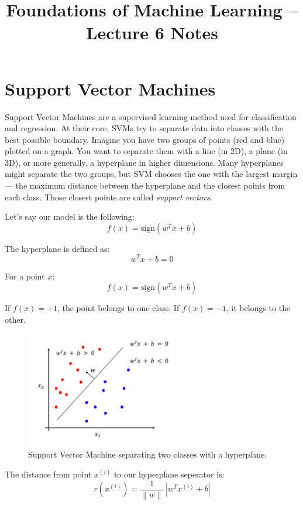 \documentclass[11pt]{article}
\title{Foundations of Machine Learning -- Lecture 6 Notes}
\author{}
\date{}
\begin{document}
\maketitle

\section*{Support Vector Machines}
Support Vector Machines are a supervised learning method used for classification and regression.
At their core, SVMs try to separate data into classes with the best possible boundary.
Imagine you have two groups of points (red and blue) plotted on a graph.
You want to separate them with a line (in 2D), a plane (in 3D), or more generally, a hyperplane in higher dimensions.
Many hyperplanes might separate the two groups, but SVM chooses the one with the largest margin — the maximum distance between the hyperplane and the closest points from each class.
Those closest points are called \textit{support vectors}.

\medskip

Let’s say our model is the following:
\[
	f(x) = \text{sign}(w^T x + b)
\]

The hyperplane is defined as:
\[
	w^T x + b = 0
\]

For a point $x$:
\[
	f(x) = \text{sign}(w^T x + b)
\]

If $f(x) = +1$, the point belongs to one class.
If $f(x) = -1$, it belongs to the other.

\begin{figure}[h!]
	\centering
	\includegraphics[width=0.6\textwidth]{../imgs/svm.png}
	\caption{Support Vector Machine separating two classes with a hyperplane.}
\end{figure}

\pagebreak
The distance from point $x^(i)$ to our hyperplane seperator is:
\[
	r(x^{(i)}) = \frac{1}{\left\lVert w \right\rVert} \, \left| w^T x^{(i)} + b \right|
\]
\end{document}
